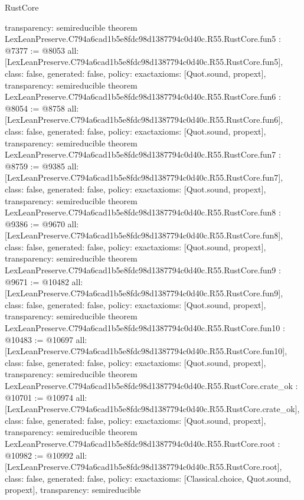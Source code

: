 \begin{lexlean}{RustCore}
\begin{coremodule}
{  transparency: semireducible
}
theorem LexLeanPreserve.C794a6cad1b5e8fdc98d1387794c0d40c.R55.RustCore.fun5 : @7377 := @8053 {
  all: [LexLeanPreserve.C794a6cad1b5e8fdc98d1387794c0d40c.R55.RustCore.fun5],
  class: false,
  generated: false,
  policy: exact{axioms: [Quot.sound, propext]},
  transparency: semireducible
}
theorem LexLeanPreserve.C794a6cad1b5e8fdc98d1387794c0d40c.R55.RustCore.fun6 : @8054 := @8758 {
  all: [LexLeanPreserve.C794a6cad1b5e8fdc98d1387794c0d40c.R55.RustCore.fun6],
  class: false,
  generated: false,
  policy: exact{axioms: [Quot.sound, propext]},
  transparency: semireducible
}
theorem LexLeanPreserve.C794a6cad1b5e8fdc98d1387794c0d40c.R55.RustCore.fun7 : @8759 := @9385 {
  all: [LexLeanPreserve.C794a6cad1b5e8fdc98d1387794c0d40c.R55.RustCore.fun7],
  class: false,
  generated: false,
  policy: exact{axioms: [Quot.sound, propext]},
  transparency: semireducible
}
theorem LexLeanPreserve.C794a6cad1b5e8fdc98d1387794c0d40c.R55.RustCore.fun8 : @9386 := @9670 {
  all: [LexLeanPreserve.C794a6cad1b5e8fdc98d1387794c0d40c.R55.RustCore.fun8],
  class: false,
  generated: false,
  policy: exact{axioms: [Quot.sound, propext]},
  transparency: semireducible
}
theorem LexLeanPreserve.C794a6cad1b5e8fdc98d1387794c0d40c.R55.RustCore.fun9 : @9671 := @10482 {
  all: [LexLeanPreserve.C794a6cad1b5e8fdc98d1387794c0d40c.R55.RustCore.fun9],
  class: false,
  generated: false,
  policy: exact{axioms: [Quot.sound, propext]},
  transparency: semireducible
}
theorem LexLeanPreserve.C794a6cad1b5e8fdc98d1387794c0d40c.R55.RustCore.fun10 : @10483 := @10697 {
  all: [LexLeanPreserve.C794a6cad1b5e8fdc98d1387794c0d40c.R55.RustCore.fun10],
  class: false,
  generated: false,
  policy: exact{axioms: [Quot.sound, propext]},
  transparency: semireducible
}
theorem LexLeanPreserve.C794a6cad1b5e8fdc98d1387794c0d40c.R55.RustCore.crate_ok : @10701 := @10974 {
  all: [LexLeanPreserve.C794a6cad1b5e8fdc98d1387794c0d40c.R55.RustCore.crate_ok],
  class: false,
  generated: false,
  policy: exact{axioms: [Quot.sound, propext]},
  transparency: semireducible
}
theorem LexLeanPreserve.C794a6cad1b5e8fdc98d1387794c0d40c.R55.RustCore.root : @10982 := @10992 {
  all: [LexLeanPreserve.C794a6cad1b5e8fdc98d1387794c0d40c.R55.RustCore.root],
  class: false,
  generated: false,
  policy: exact{axioms: [Classical.choice, Quot.sound, propext]},
  transparency: semireducible
}


\end{coremodule}
\end{lexlean}
